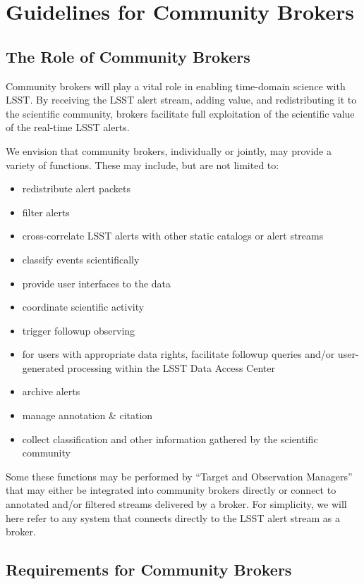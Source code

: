 \section{Guidelines for Community Brokers}\label{sec:community_brokers}

\subsection{The Role of Community Brokers}

Community brokers will play a vital role in enabling time-domain science with LSST.
By receiving the LSST alert stream, adding value, and redistributing it to the scientific community, brokers facilitate full exploitation of the scientific value of the real-time LSST alerts.

We envision that community brokers, individually or jointly, may provide a variety of functions.  These may include, but are not limited to:

\begin{itemize}
	\item redistribute alert packets
	\item filter alerts
	\item cross-correlate LSST alerts with other static catalogs or alert streams
	\item classify events scientifically
	\item provide user interfaces to the data
	\item coordinate scientific activity 
	\item trigger followup observing
	\item for users with appropriate data rights, facilitate followup queries and/or user-generated processing within the LSST Data Access Center
	\item archive alerts
	\item manage annotation \& citation 
	\item collect classification and other information gathered by the scientific community
\end{itemize}

Some these functions may be performed by ``Target and Observation Managers'' that may either be integrated into community brokers directly or connect to annotated and/or filtered streams delivered by a broker.
For simplicity, we will here refer to any system that connects directly to the LSST alert stream as a broker.

\subsection{Requirements for Community Brokers}

